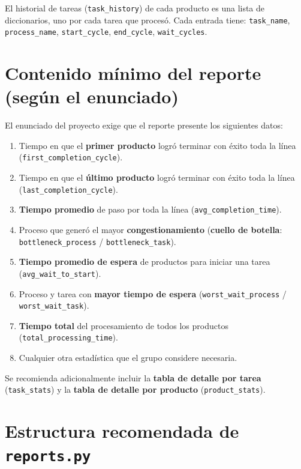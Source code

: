 \documentclass[12pt,letterpaper]{article}
\newcommand{\cmark}{\textcolor{accentgreen}{\ding{51}}}
\begin{document}
El historial de tareas (\texttt{task\_history}) de cada producto es una lista de
diccionarios, uno por cada tarea que procesó. Cada entrada tiene:
\texttt{task\_name}, \texttt{process\_name}, \texttt{start\_cycle},
\texttt{end\_cycle}, \texttt{wait\_cycles}.

\section{Contenido mínimo del reporte (según el enunciado)}

El enunciado del proyecto exige que el reporte presente los siguientes datos:

\begin{enumerate}[leftmargin=2em]
  \item[\cmark] Tiempo en que el \textbf{primer producto} logró terminar con
    éxito toda la línea (\texttt{first\_completion\_cycle}).
  \item[\cmark] Tiempo en que el \textbf{último producto} logró terminar con
    éxito toda la línea (\texttt{last\_completion\_cycle}).
  \item[\cmark] \textbf{Tiempo promedio} de paso por toda la línea
    (\texttt{avg\_completion\_time}).
  \item[\cmark] Proceso que generó el mayor \textbf{congestionamiento}
    (\textbf{cuello de botella}: \texttt{bottleneck\_process} /
    \texttt{bottleneck\_task}).
  \item[\cmark] \textbf{Tiempo promedio de espera} de productos para iniciar
    una tarea (\texttt{avg\_wait\_to\_start}).
  \item[\cmark] Proceso y tarea con \textbf{mayor tiempo de espera}
    (\texttt{worst\_wait\_process} / \texttt{worst\_wait\_task}).
  \item[\cmark] \textbf{Tiempo total} del procesamiento de todos los productos
    (\texttt{total\_processing\_time}).
  \item[\cmark] Cualquier otra estadística que el grupo considere necesaria.
\end{enumerate}

Se recomienda adicionalmente incluir la \textbf{tabla de detalle por tarea}
(\texttt{task\_stats}) y la \textbf{tabla de detalle por producto}
(\texttt{product\_stats}).

\section{Estructura recomendada de \texttt{reports.py}}
\end{document}
